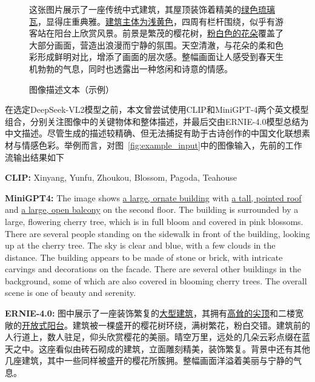 \begin{figure}[ht]
  \centering
  \begin{tcolorbox}[
      colback=white,
      colframe=black,
      boxrule=1pt,
      arc=0mm,
      width=0.8\linewidth,  %
      ]
      \kaishu
      这张图片展示了一座传统中式建筑，其屋顶装饰着精美的\underline{绿色琉璃瓦}，显得庄重典雅。\underline{建筑主体为浅黄色}，四周有栏杆围绕，似乎有游客站在阳台上欣赏风景。前景是繁茂的樱花树，\underline{粉白色的花朵}覆盖了大部分画面，营造出浪漫而宁静的氛围。天空清澈，与花朵的柔和色彩形成鲜明对比，增添了画面的层次感。整幅画面让人感受到春天生机勃勃的气息，同时也透露出一种悠闲和诗意的情感。
  \end{tcolorbox}
  \caption{图像描述文本（示例）}
  \label{fig:example_image_desc} %
\end{figure}


在选定DeepSeek-VL2模型之前，本文曾尝试使用CLIP和MiniGPT-4两个英文模型组合，分别关注图像中的关键物体和整体描述，并最后交由ERNIE-4.0模型总结为中文描述。尽管生成的描述较精确、但无法捕捉有助于古诗创作的中国文化联想素材与情感色彩。举例而言，对图~\ref{fig:example_input}中的图像输入，先前的工作流输出结果如下%

{\kaishu 
\textbf{CLIP:} Xinyang, Yunfu, Zhoukou, Blossom, Pagoda, Teahouse\par
\textbf{MiniGPT4:} The image shows \underline{a large, ornate building} with \underline{a tall, pointed roof} and \underline{a large, open balcony} on the second floor. The building is surrounded by a large, flowering cherry tree, which is in full bloom and covered in pink blossoms. There are several people standing on the sidewalk in front of the building, looking up at the cherry tree. The sky is clear and blue, with a few clouds in the distance. The building appears to be made of stone or brick, with intricate carvings and decorations on the facade. There are several other buildings in the background, some of which are also covered in blooming cherry trees. The overall scene is one of beauty and serenity. \par
\textbf{ERNIE-4.0:} 图中展示了一座装饰繁复的\underline{大型建筑}，其拥有\underline{高耸的尖顶}和二楼宽敞的\underline{开放式阳台}。建筑被一棵盛开的樱花树环绕，满树繁花，粉白交错。建筑前的人行道上，数人驻足，仰头欣赏樱花的美丽。晴空万里，远处的几朵云彩点缀在蓝天之中。这座看似由砖石砌成的建筑，立面雕刻精美，装饰繁复。背景中还有其他几座建筑，其中一些同样被盛开的樱花所簇拥。整幅画面洋溢着美丽与宁静的气息。
}

